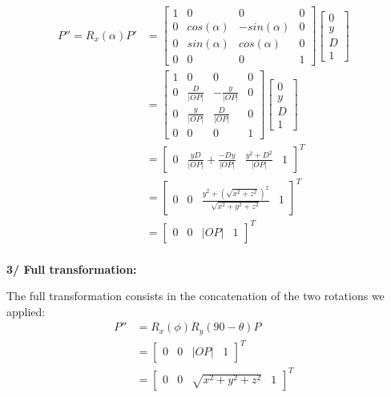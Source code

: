 \documentclass[a4paper,10pt]{article}
\begin{document}
\begin{equation}
\left.\begin{aligned}
P'' = R_x(\alpha)P'
&=
\begin{bmatrix}
	1 & 0 			& 0 		   & 0 \\
	0 & cos(\alpha) & -sin(\alpha) & 0 \\
	0 & sin(\alpha) & cos(\alpha)  & 0 \\
	0 & 0 			& 0 		   & 1
\end{bmatrix}
\begin{bmatrix}
0 \\ y \\ D \\ 1
\end{bmatrix}&\\
&=
\begin{bmatrix}
	1 & 0 			   & 0 		         & 0 \\
	0 & \frac{D}{|OP|} & -\frac{y}{|OP|} & 0 \\
	0 & \frac{y}{|OP|} & \frac{D}{|OP|}  & 0 \\
	0 & 0 			   & 0 		         & 1
\end{bmatrix}
\begin{bmatrix}
0 \\ y \\ D \\ 1
\end{bmatrix}&\\
&=
\begin{bmatrix}
0 & \frac{yD}{|OP|} + \frac{-Dy}{|OP|} & \frac{y^2 + D^2}{|OP|} & 1
\end{bmatrix}^{T}&\\
&=
\begin{bmatrix}
0 & 0 & \frac{y^2 + (\sqrt{x^2 + z^2})^2}{\sqrt{x^2 + y^2 + z^2}} & 1
\end{bmatrix}^{T}&\\
&=
\begin{bmatrix}
0 & 0 & |OP| & 1
\end{bmatrix}^{T}&\\
\end{aligned}\right.
\end{equation}

\bigskip \bigskip \noindent
\textbf{3/ Full transformation:}

\bigskip \noindent
The full transformation consists in the concatenation of the two rotations we applied:
\begin{equation}
\left.\begin{aligned}
P'' &= R_x(\phi)R_y(90 - \theta)P&\\
&=
\begin{bmatrix}
0 & 0 & |OP| & 1
\end{bmatrix}^{T}&\\
&=
\begin{bmatrix}
0 & 0 & \sqrt{x^2 + y^2 + z^2} & 1
\end{bmatrix}^{T}&\\
\end{aligned}\right.
\end{equation}
\end{document}
